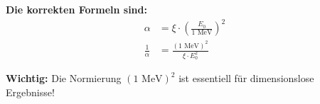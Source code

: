	\begin{tcolorbox}[colback=blue!5!white,colframe=blue!75!black]
		\textbf{Die korrekten Formeln sind:}
		\begin{align*}
			\alpha &= \xi \cdot \left(\frac{E_0}{1 \text{ MeV}}\right)^2 \\
			\frac{1}{\alpha} &= \frac{(1 \text{ MeV})^2}{\xi \cdot E_0^2}
		\end{align*}
	\end{tcolorbox}
	
	\begin{tcolorbox}[colback=red!5!white,colframe=red!75!black]
		\textbf{Wichtig:} Die Normierung $(1 \text{ MeV})^2$ ist essentiell für dimensionslose Ergebnisse!
	\end{tcolorbox}
